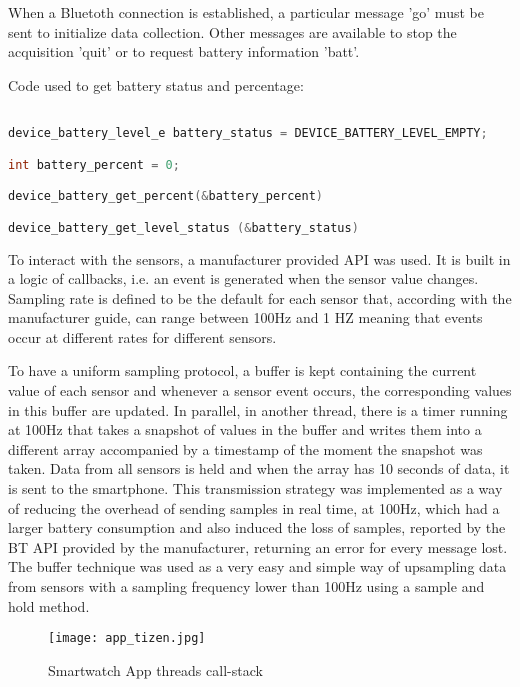When a Bluetoth connection is established, a particular message 'go' must be sent to initialize data collection. Other messages are available to stop the acquisition 'quit' or to request battery information 'batt'.

Code used to get battery status and percentage:

\bigskip
\begin{lstlisting}[language=C++]

device_battery_level_e battery_status = DEVICE_BATTERY_LEVEL_EMPTY;

int battery_percent = 0;

device_battery_get_percent(&battery_percent)

device_battery_get_level_status (&battery_status)

\end{lstlisting}
\bigskip

To interact with the sensors, a manufacturer provided API was used. It is built in a logic of callbacks, i.e. an event is generated when the sensor value changes.
Sampling rate is defined to be the default for each sensor that, according with the manufacturer guide, can range between 100Hz and 1 HZ \cite{Tizen_sensor} meaning that events occur at different rates for different sensors. 

To have a uniform sampling protocol, a buffer is kept containing the current value of each sensor and whenever a sensor event occurs, the corresponding values in this buffer are updated. In parallel, in another thread, there is a timer running at 100Hz that takes a snapshot of values in the buffer and writes them into a different array accompanied by a timestamp of the moment the snapshot was taken. Data from all sensors is held and when the array has 10 seconds of data, it is sent to the smartphone. This transmission strategy was implemented as a way of reducing the overhead of sending samples in real time, at 100Hz, which had a larger battery consumption and also induced the loss of samples, reported by the BT API provided by the manufacturer, returning an error for every message lost. The buffer technique was used as a very easy and simple way of upsampling data from sensors with a sampling frequency lower than 100Hz using a sample and hold method.

\begin{figure}[!h]
	\centering
	\texttt{[image: app\_tizen.jpg]}
	\caption{Smartwatch App threads call-stack}
	\label{fig:app_tizen}
\end{figure}


